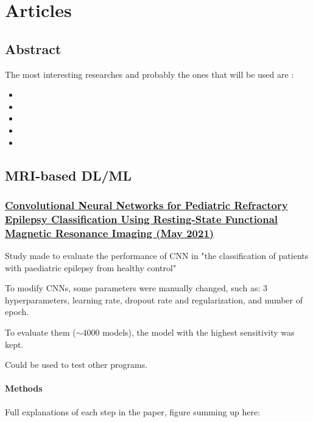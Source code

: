 \chapter{Articles}

\section{Abstract}

The most interesting researches and probably the ones that will be used are :
\begin{itemize}
	\item {}
	\item {}
	\item {}
	\item {}
	\item {}
\end{itemize}

\section{MRI-based DL/ML}

\subsection{\href{https://www.sciencedirect.com/science/article/pii/S187887502032698X\#abssec0015}{Convolutional Neural Networks for Pediatric Refractory Epilepsy Classification Using Resting-State Functional Magnetic Resonance Imaging (May 2021)}}
\label{sub:sec:res1}

Study made to evaluate the performance of CNN in "the classification of patients with paediatric epilepsy from healthy control"

To modify CNNs, some parameters were manually changed, such as: 3 hyperparameters, learning rate, dropout rate and regularization, and number of epoch.

To evaluate them ($\sim$4000 models), the model with the highest sensitivity was kept.

Could be used to test other programs.

\subsubsection{Methods}

Full explanations of each step in the paper, figure summing up here: 

